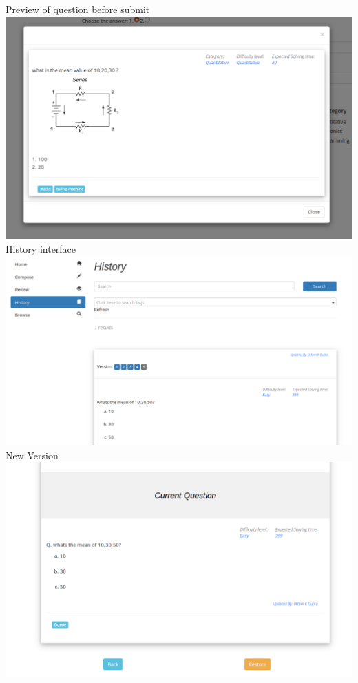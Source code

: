 \documentclass[a4paper,12pt,oneside]{book}
\begin{document}
\vspace{0.7in}
Preview of question before submit\\
\includegraphics[scale=0.37]{preview.png}	\\

History interface\\
\includegraphics[scale=0.3]{history.png}	\\

\newpage \vspace{2in}
New Version \\
\includegraphics[scale=0.4]{version1.png}	\\
\end{document}
